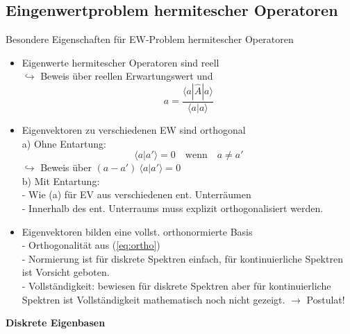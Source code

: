 \documentclass[10pt,article,colorback,accentcolor=tud9d]{scrartcl}
\begin{document}
\subsection{Eingenwertproblem hermitescher Operatoren}
Besondere Eigenschaften für EW-Problem hermitescher Operatoren
  \begin{itemize}
    \item Eigenwerte hermitescher Operatoren sind reell\\
      $\hookrightarrow$ Beweis über reellen Erwartungswert und 
      \begin{equation}
      a=\frac{\langle a|\hat{A}|a\rangle }{\langle a|a\rangle }
      \end{equation}
    \item Eigenvektoren zu verschiedenen EW sind orthogonal\\ 
      a) Ohne Entartung:
         \begin{equation}
        \label{eq:ortho}
          \langle a|a'\rangle  = 0 \quad \text{wenn} \quad a \neq a'
          \end{equation}
          $\hookrightarrow$ Beweis über $(a-a') \ \langle a|a'\rangle  = 0$\\ 
      b) Mit Entartung:\\
         - Wie (a) für EV aus verschiedenen ent. Unterräumen\\
         - Innerhalb des ent. Unterraums muss explizit orthogonalisiert werden.
    \item Eigenvektoren bilden eine vollst. orthonormierte Basis\\
      - Orthogonalität aus (\ref{eq:ortho})\\
      - Normierung ist für diskrete Spektren einfach, für kontinuierliche Spektren ist Vorsicht geboten.\\
      - Vollständigkeit: bewiesen für diskrete Spektren aber für kontinuierliche Spektren ist Vollständigkeit mathematisch noch nicht gezeigt. $\rightarrow$ Postulat!
  \end{itemize}
\textbf{Diskrete Eigenbasen}
\end{document}

